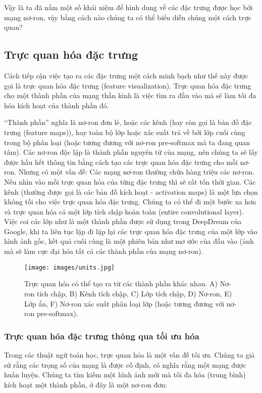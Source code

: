 Vậy là ta đã nắm một số khái niệm để hình dung về các đặc trưng được học bởi mạng nơ-ron, vậy bằng cách nào chúng ta có thể biểu diễn chúng một cách trực quan?

\subsection{Trực quan hóa đặc trưng}

Cách tiếp cận việc tạo ra các đặc trưng một cách minh bạch như thế này được gọi là trực quan hóa đặc trưng (feature visualization). Trực quan hóa đặc trưng cho một thành phần của mạng thần kinh là việc tìm ra đầu vào mà sẽ làm tối đa hóa kích hoạt của thành phần đó.

“Thành phần” nghĩa là nơ-ron đơn lẻ, hoặc các kênh (hay còn gọi là bản đồ đặc trưng (feature maps)), hay toàn bộ lớp hoặc xác suất trả về bởi lớp cuối cùng trong bộ phân loại (hoặc tương đương với nơ-ron pre-softmax mà ta đang quan tâm). Các nơ-ron độc lập là thành phần nguyên tử của mạng, nên chúng ta sẽ lấy được hầu hết thông tin bằng cách tạo các trực quan hóa đặc trưng cho mỗi nơ-ron. Nhưng có một vấn đề: Các mạng nơ-ron thường chứa hàng triệu các nơ-ron. Nếu nhìn vào mỗi trực quan hóa của từng đặc trưng thì sẽ rất tốn thời gian. Các kênh (thường được gọi là các bản đồ kích hoạt - activation maps) là một lựa chọn không tồi cho việc trực quan hóa đặc trưng. Chúng ta có thể đi một bước xa hơn và trực quan hóa cả một lớp tích chập hoàn toàn (entire convolutional layer). Việc coi các lớp như là một thành phần được sử dụng trong DeepDream của Google, khi ta liên tục lặp đi lặp lại các trực quan hóa đặc trưng của một lớp vào hình ảnh gốc, kết quả cuối cùng là một phiên bản như mơ ước của đầu vào (ảnh mà sẽ làm cực đại hóa tất cả các thành phần của mạng nơ-ron).

\begin{figure*}[h!]
	\centering
	\texttt{[image: images/units.jpg]}
	\label{fig:7_2}
	\caption{Trực quan hóa có thể tạo ra từ các thành phần khác nhau. A) Nơ-ron tích chập, B) Kênh tích chập, C) Lớp tích chập, D) Nơ-ron, E) Lớp ẩn, F) Nơ-ron xác suất phân loại lớp (hoặc tương đương với nơ-ron pre-softmax).}
\end{figure*}

\subsubsection{Trực quan hóa đặc trưng thông qua tối ưu hóa}

Trong các thuật ngữ toán học, trực quan hóa là một vấn đề tối ưu. Chúng ta giả sử rằng các trọng số của mạng là được cố định, có nghĩa rằng một mạng được huấn luyện. Chúng ta tìm kiếm một hình ảnh mới mà tối đa hóa (trung bình) kích hoạt một thành phần, ở đây là một nơ-ron đơn:

